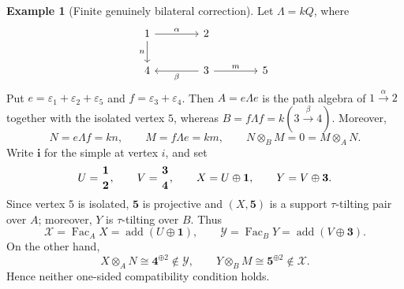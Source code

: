 \documentclass[11pt,reqno]{amsart}
\theoremstyle{definition}
\newtheorem{example}[theorem]{Example}
\theoremstyle{remark}
\newcommand{\Fac}{\operatorname{Fac}}
\newcommand{\addc}{\operatorname{add}}
\numberwithin{equation}{section}
\begin{document}
\begin{example}[Finite genuinely bilateral correction]
\label{ex:bilateral-finite}
Let $\Lambda=kQ$, where
\[
\begin{tikzcd}[column sep=4em,row sep=2em]
 1 \arrow[r,"\alpha"] \arrow[d,"n"'] & 2 \\
 4 & 3 \arrow[l,"\beta"] \arrow[r,"m"] & 5
\end{tikzcd}
\]
Put $e=\varepsilon_1+\varepsilon_2+\varepsilon_5$ and
$f=\varepsilon_3+\varepsilon_4$.  Then $A=e\Lambda e$ is the path algebra
of $1\xrightarrow{\alpha}2$ together with the isolated vertex $5$, whereas
$B=f\Lambda f=k(3\xrightarrow{\beta}4)$.  Moreover,
\[
 N=e\Lambda f=kn,
 \qquad M=f\Lambda e=km,
 \qquad N\otimes_BM=0=M\otimes_AN.
\]
Write $\mathbf i$ for the simple at vertex $i$, and set
\[
 U=\genfrac{}{}{0pt}{}{\mathbf1}{\mathbf2},
 \qquad
 V=\genfrac{}{}{0pt}{}{\mathbf3}{\mathbf4},
 \qquad
 X=U\oplus\mathbf1,
 \qquad
 Y=V\oplus\mathbf3.
\]
Since vertex $5$ is isolated, $\mathbf5$ is projective and
$(X,\mathbf5)$ is a support $\tau$-tilting pair over $A$; moreover, $Y$ is
$\tau$-tilting over $B$.  Thus
\[
 \mathcal X=\Fac_AX=\addc(U\oplus\mathbf1),
 \qquad
 \mathcal Y=\Fac_BY=\addc(V\oplus\mathbf3).
\]
On the other hand,
\[
 X\otimes_AN\cong\mathbf4^{\oplus2}\notin\mathcal Y,
 \qquad
 Y\otimes_BM\cong\mathbf5^{\oplus2}\notin\mathcal X.
\]
Hence neither one-sided compatibility condition holds.


\end{example}
\end{document}

